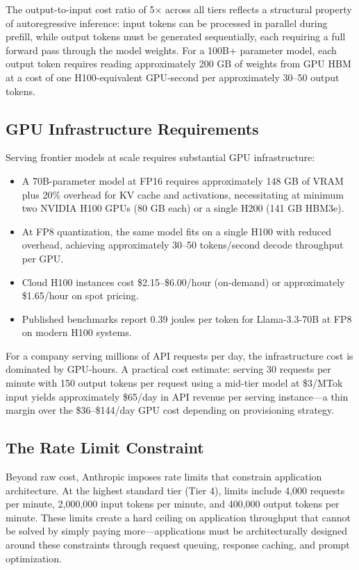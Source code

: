 \documentclass[12pt, letterpaper, twoside]{report}
\begin{document}
The output-to-input cost ratio of 5$\times$ across all tiers reflects a structural property of autoregressive inference: input tokens can be processed in parallel during prefill, while output tokens must be generated sequentially, each requiring a full forward pass through the model weights. For a 100B+ parameter model, each output token requires reading approximately 200 GB of weights from GPU HBM at a cost of one H100-equivalent GPU-second per approximately 30--50 output tokens.

\subsection{GPU Infrastructure Requirements}

Serving frontier models at scale requires substantial GPU infrastructure:

\begin{itemize}[itemsep=1pt, topsep=2pt, parsep=0pt]
\item A 70B-parameter model at FP16 requires approximately 148 GB of VRAM plus 20\% overhead for KV cache and activations, necessitating at minimum two NVIDIA H100 GPUs (80 GB each) or a single H200 (141 GB HBM3e).
\item At FP8 quantization, the same model fits on a single H100 with reduced overhead, achieving approximately 30--50 tokens/second decode throughput per GPU.
\item Cloud H100 instances cost \$2.15--\$6.00/hour (on-demand) or approximately \$1.65/hour on spot pricing.
\item Published benchmarks report 0.39 joules per token for Llama-3.3-70B at FP8 on modern H100 systems.
\end{itemize}

For a company serving millions of API requests per day, the infrastructure cost is dominated by GPU-hours. A practical cost estimate: serving 30 requests per minute with 150 output tokens per request using a mid-tier model at \$3/MTok input yields approximately \$65/day in API revenue per serving instance---a thin margin over the \$36--\$144/day GPU cost depending on provisioning strategy.

\subsection{The Rate Limit Constraint}

Beyond raw cost, Anthropic imposes rate limits that constrain application architecture. At the highest standard tier (Tier 4), limits include 4,000 requests per minute, 2,000,000 input tokens per minute, and 400,000 output tokens per minute. These limits create a hard ceiling on application throughput that cannot be solved by simply paying more---applications must be architecturally designed around these constraints through request queuing, response caching, and prompt optimization.
\end{document}
